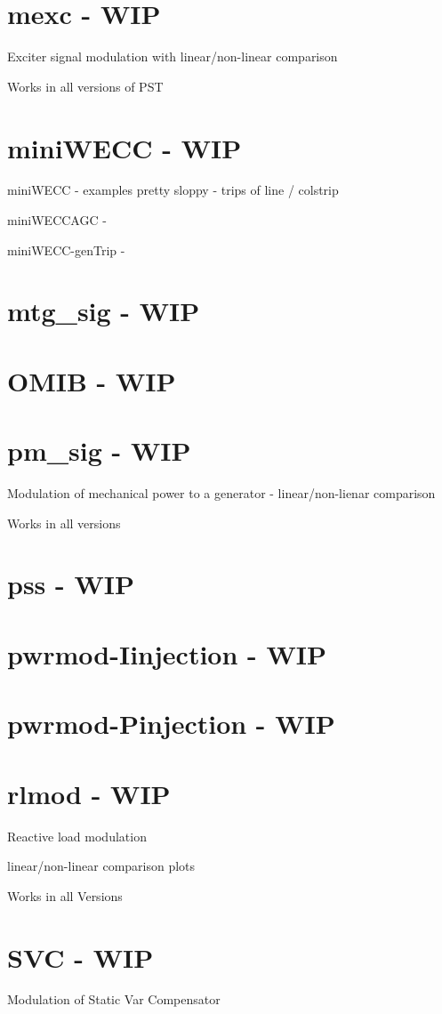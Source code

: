 \section{mexc - WIP}
Exciter signal modulation with linear/non-linear comparison

Works in all versions of PST

\section{miniWECC - WIP}
	miniWECC - examples pretty sloppy - trips of line / colstrip

	miniWECCAGC - 

	miniWECC-genTrip -


\section{mtg\_sig - WIP}
\section{OMIB - WIP}
\section{pm\_sig - WIP}
Modulation of mechanical power to a generator - linear/non-lienar comparison

Works in all versions

\section{pss  - WIP}
\section{pwrmod-Iinjection - WIP}

\section{pwrmod-Pinjection  - WIP}

\section{rlmod - WIP}
Reactive load modulation

linear/non-linear comparison plots

Works in all Versions

\section{SVC - WIP}
Modulation of Static Var Compensator

